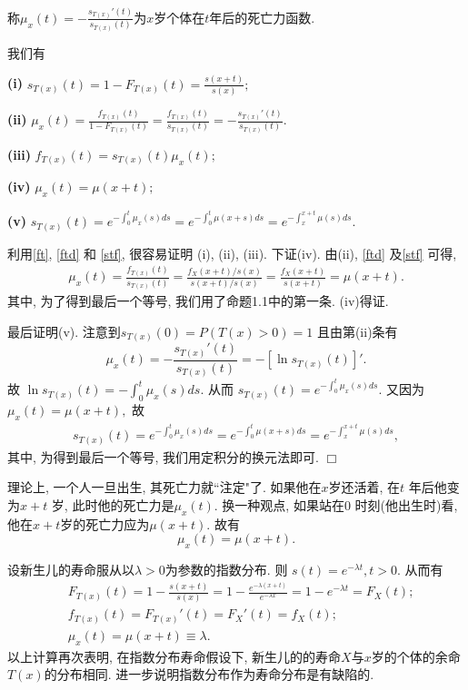 \documentclass[a4paper,openany, 10pt]{ctexbook}
\def\qed{\hfill$\Box$\medskip}
\begin{document}
\begin{definition}
    称$\mu_x(t) = -\frac{s_{T(x)}'(t)}{s_{T(x)}(t)}$为$x$岁个体在$t$年后的死亡力函数.
\end{definition}

\begin{proposition}\label{p21} 我们有

    {\bf(i)} $s_{T(x)}(t)=1-F_{T(x)}(t)=\frac{s(x+t)}{s(x)};$

    {\bf(ii)} $\mu_{x}(t)=\frac{f_{T(x)}(t)}{1-F_{T(x)}(t)}=\frac{f_{T(x)}(t)}{s_{T(x)}(t)}=-\frac{s_{T(x)}'(t)}{s_{T(x)}(t)}.$

    {\bf(iii)} $f_{T(x)}(t)=s_{T(x)}(t)\mu_{x}(t);$

    {\bf(iv)} $\mu_x(t)=\mu(x+t);$

    {\bf(v)} $s_{T(x)}(t)=e^{-\int_0^t \mu_x(s)ds}=e^{-\int_0^t \mu(x+s)ds}=e^{-\int_x^{x+t} \mu(s)ds}.$

\end{proposition}
\proof 利用\eqref{ft}, \eqref{ftd} 和 \eqref{stf}, 很容易证明 (i), (ii), (iii). 下证(iv). 由(ii), \eqref{ftd} 及\eqref{stf} 可得,
\begin{align*}
    \mu_{x}(t)=\frac{f_{T(x)}(t)}{s_{T(x)}(t)}=\frac{f_{X}(x+t)/s(x)}{s(x+t)/s(x)}=\frac{f_{X}(x+t)}{s(x+t)}=\mu(x+t).
\end{align*}
其中, 为了得到最后一个等号, 我们用了命题1.1中的第一条. (iv)得证.

最后证明(v). 注意到$s_{T(x)}(0)=P(T(x)>0)=1$ 且由第(ii)条有
$$\mu_{x}(t)=-\frac{s_{T(x)}'(t)}{s_{T(x)}(t)}=-[\ln s_{T(x)}(t)]'.$$
故 $\ln s_{T(x)}(t)=-\int_0^t\mu_x(s)ds.$ 从而
$s_{T(x)}(t)=e^{-\int_0^t\mu_x(s)ds}.$ 又因为$\mu_x(t)=\mu(x+t),$ 故
\begin{align*}
    s_{T(x)}(t)=e^{-\int_0^t\mu_x(s)ds}=e^{-\int_0^t\mu(x+s)ds}=e^{-\int_x^{x+t} \mu(s)ds},
\end{align*}
其中, 为得到最后一个等号, 我们用定积分的换元法即可. \qed


\begin{remark}
    理论上, 一个人一旦出生, 其死亡力就``注定"了. 如果他在$x$岁还活着, 在$t$ 年后他变为$x+t$ 岁, 此时他的死亡力是$\mu_x(t).$ 换一种观点, 如果站在0 时刻(他出生时)看, 他在$x+t$岁的死亡力应为$\mu(x+t).$ 故有
    $$\mu_x(t)=\mu(x+t).$$
\end{remark}

\begin{example}
    设新生儿的寿命服从以$\lambda>0$为参数的指数分布. 则
    $s(t)=e^{-\lambda t}, t>0.$ 从而有
    \begin{align*}
         & F_{T(x)}(t)=1-\frac{s(x+t)}{s(x)}=1-\frac{e^{-\lambda(x+t)}}{e^{-\lambda x}}=1-e^{-\lambda t} =F_X(t); \\
         & f_{T(x)}(t)=F_{T(x)}'(t)=F_X'(t)=f_X(t);                                                               \\
         & \mu_x(t)=\mu(x+t)\equiv\lambda.
    \end{align*}
    以上计算再次表明, 在指数分布寿命假设下, 新生儿的的寿命$X$与$x$岁的个体的余命$T(x)$的分布相同. 进一步说明指数分布作为寿命分布是有缺陷的.
\end{example}
\end{document}
